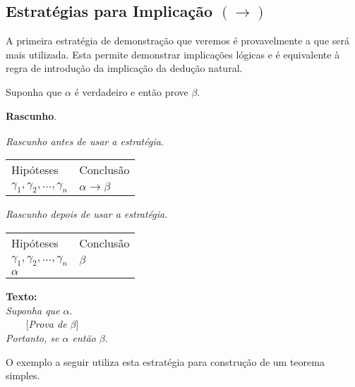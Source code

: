 \subsection{Estratégias para Implicação $(\to)$}

A primeira estratégia de demonstração que veremos é provavelmente a
que será  mais utilizada. Esta permite demonstrar implicações lógicas
e é equivalente à regra de introdução da implicação da dedução
natural.

\begin{ProofStrategy}
Suponha que $\alpha$ é verdadeiro e então prove $\beta$.
\begin{flushleft}
 \textbf{Rascunho}.\\
\verb| |\\

\textit{Rascunho antes de usar a estratégia}.
\verb| |\\
\begin{tabular}{ll}
Hipóteses & Conclusão \\
$\gamma_1,\gamma_2,...,\gamma_n$ & $\alpha\to \beta$\\
\end{tabular}

\textit{Rascunho depois de usar a estratégia}.
\verb| |\\
\begin{tabular}{ll}
Hipóteses & Conclusão \\
$\gamma_1,\gamma_2,...,\gamma_n$ & $\beta$\\
$\alpha$                                              & \\
\end{tabular}
\end{flushleft}
\begin{flushleft}
\textbf{Texto:}\\
\textit{Suponha que $\alpha$}.\\
\verb|    |[\textit{Prova de $\beta$}]\\
\textit{Portanto, se $\alpha$ então $\beta$}.
\end{flushleft}
\end{ProofStrategy}

O exemplo a seguir utiliza esta estratégia para construção de um
teorema simples.

\begin{Example}
\end{Example}